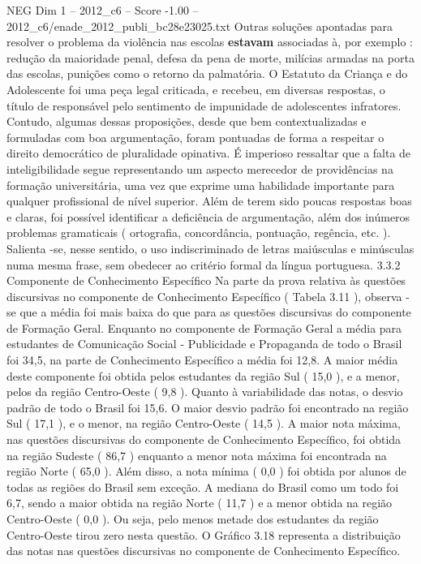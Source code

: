 \begin{textsample}{NEG Dim 1 – 2012\_c6 – Score -1.00 – 2012\_c6/enade\_2012\_publi\_bc28e23025.txt}
Outras soluções apontadas para resolver o problema da violência nas escolas \textbf{estavam} associadas à, por exemplo : redução da maioridade penal, defesa da pena de morte, milícias armadas na porta das escolas, punições como o retorno da palmatória.
O Estatuto da Criança e do Adolescente foi uma peça legal criticada, e recebeu, em diversas respostas, o título de responsável pelo sentimento de impunidade de adolescentes infratores.
Contudo, algumas dessas proposições, desde que bem contextualizadas e formuladas com boa argumentação, foram pontuadas de forma a respeitar o direito democrático de pluralidade opinativa.
É imperioso ressaltar que a falta de inteligibilidade segue representando um aspecto merecedor de providências na formação universitária, uma vez que exprime uma habilidade importante para qualquer profissional de nível superior.
Além de terem sido poucas respostas boas e claras, foi possível identificar a deficiência de argumentação, além dos inúmeros problemas gramaticais ( ortografia, concordância, pontuação, regência, etc. ).
Salienta -se, nesse sentido, o uso indiscriminado de letras maiúsculas e minúsculas numa mesma frase, sem obedecer ao critério formal da língua portuguesa. 3.3.2 Componente de Conhecimento Específico Na parte da prova relativa às questões discursivas no componente de Conhecimento Específico ( Tabela 3.11 ), observa -se que a média foi mais baixa do que para as questões discursivas do componente de Formação Geral.
Enquanto no componente de Formação Geral a média para estudantes de Comunicação Social - Publicidade e Propaganda de todo o Brasil foi 34,5, na parte de Conhecimento Específico a média foi 12,8.
A maior média deste componente foi obtida pelos estudantes da região Sul ( 15,0 ), e a menor, pelos da região Centro-Oeste ( 9,8 ).
Quanto à variabilidade das notas, o desvio padrão de todo o Brasil foi 15,6.
O maior desvio padrão foi encontrado na região Sul ( 17,1 ), e o menor, na região Centro-Oeste ( 14,5 ).
A maior nota máxima, nas questões discursivas do componente de Conhecimento Específico, foi obtida na região Sudeste ( 86,7 ) enquanto a menor nota máxima foi encontrada na região Norte ( 65,0 ).
Além disso, a nota mínima ( 0,0 ) foi obtida por alunos de todas as regiões do Brasil sem exceção.
A mediana do Brasil como um todo foi 6,7, sendo a maior obtida na região Norte ( 11,7 ) e a menor obtida na região Centro-Oeste ( 0,0 ).
Ou seja, pelo menos metade dos estudantes da região Centro-Oeste tirou zero nesta questão.
O Gráfico 3.18 representa a distribuição das notas nas questões discursivas no componente de Conhecimento Específico.

\end{textsample}
